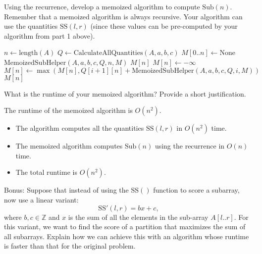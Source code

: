 \documentclass[11pt,fleqn]{exam}
\newenvironment{soln}{\color{solnblue}}{}
\newcommand{\subsum}{\mbox{SS}}
\newcommand{\sub}{\mbox{Sub}}
\newif\ifsolutions\solutionstrue
\newif\ifsolutions\solutionsfalse
\begin{document}
\begin{questions}
\begin{soln}
\end{soln}

\ifsolutions

\else
\fi

\question[5]
Using the recurrence, develop a memoized algorithm to compute $\sub(n)$. Remember that a memoized algorithm is always recursive. Your algorithm can use the quantities $\subsum(l,r)$ (since these values can be pre-computed by your algorithm from part 1 above).

\begin{soln}
   \begin{algorithmic}[1]
         \State $n \gets \mbox{length}(A)$
         \State $Q \gets \mbox{CalculateAllQuantities}(A, a, b, c)$
         \State $M[0..n] \gets \mbox{None}$ 
         \State \Return $\mbox{MemoizedSubHelper}(A, a, b, c, Q, n, M)$
      \EndFunction
      \State
            \State {}
         \EndIf
            \State \Return $M[n]$
         \EndIf
         \State $M[n] \gets -\infty$  
            \State $M[n] \gets \max(M[n], Q[i+1][n] + \mbox{MemoizedSubHelper}(A, a, b, c, Q, i, M))$
         \EndFor
         \State \Return $M[n]$
      \EndFunction
\end{algorithmic}

\end{soln}


\ifsolutions

\else
\fi


\question[2]
What is the runtime of your memoized algorithm?  Provide a short justification.

\begin{soln}
   The runtime of the memoized algorithm is $O(n^2)$.
   \begin{itemize}
      \item The algorithm computes all the quantities $\subsum(l,r)$ in $O(n^2)$ time.
      \item The memoized algorithm computes $\sub(n)$ using the recurrence in $O(n)$ time.
      \item The total runtime is $O(n^2)$.
   \end{itemize}
\end{soln}

\ifsolutions

\else
\fi

\question[3]
Bonus: Suppose that instead of using the $\subsum()$ function to score a subarray, now use a linear variant:
\[
    \subsum'(l,r) = bx + c,
\]
where $b, c \in \mathbb{Z}$ and $x$ is the sum of all the elements in the sub-array $A[l..r]$. For this variant, we want to find the score of a partition that maximizes the sum of all subarrays.  Explain how we can achieve this with an algorithm whose runtime is faster than that for the original problem.


\end{questions}
\end{document}
